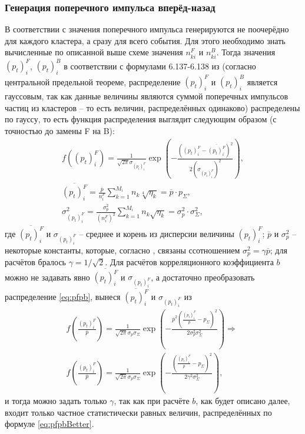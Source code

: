 \subsubsection{Генерация поперечного импульса вперёд-назад}
В соответствии с \cite{dissert} значения поперечного импульса генерируются не поочерёдно для каждого кластера, а сразу для всего события. 
Для этого необходимо знать вычисленные по описанной выше схеме значения $n^F_{ki}$ и $n^B_{ki}$. 
Тогда значения $(p_t)_i^F$, $(p_t)_i^B$ в соответствии с формулами 6.137-6.138 из \cite{dissert} (согласно центральной предельной теореме, распределение $(p_t)_i^F$ и $(p_t)_i^B$ является гауссовым, так как данные величины являются суммой поперечных импульсов частиц из кластеров -- то есть величин, распределённых одинаково) распределены по гауссу, то есть функция распределения выглядит следующим образом (с точностью до замены F на B):
\begin{equation} \label{eq:pfpb}
\begin{split}
	f((p_t)_i^F) = \frac{1}{\sqrt{2\pi} \sigma_{(p_t)_i^F}} \exp{\left( - \frac{((p_t)_i^F - \overline{(p_t)_i^F})^2}{2(\sigma_{(p_t)_i^F})^2} \right)}, \\
	\overline{(p_t)_i^F} = \frac{\overline{p}}{n_i^F} \sum_{k = 1}^{M_i} n_k \sqrt[4]{\eta_k} = \overline{p} \cdot p_\Sigma, \qquad \quad \quad \\
	\sigma_{(p_t)_i^F}^2 = \frac{\sigma_p^2}{(n_i^F)^2} \sum_{k = 1}^{M_i} n_k \sqrt{\eta_k} = \sigma_p^2 \cdot \sigma_\Sigma^2, \quad \quad \quad
\end{split}
\end{equation}
где $\overline{(p_t)_i^F}$ и $\sigma_{(p_t)_i^F}$ -- среднее и корень из дисперсии величины $(p_t)_i^F$; $\overline{p}$ и $\sigma_p^2$ -- некоторые константы, которые, согласно \cite{dissert}, связаны ссотношением $\sigma_p^2 = \gamma \overline{p}$; для расчётов бралось $\gamma = 1/\sqrt{2}$. 
Для расчётов корреляционного коэффициента $b$ можно не задавать явно $\overline{(p_t)_i^F}$ и $\sigma_{(p_t)_i^F}$, а достаточно преобразовать распределение \ref{eq:pfpb}, вынеся $\overline{(p_t)_i^F}$ и $\sigma_{(p_t)_i^F}$ из 
\begin{equation} \label{eq:pfpbBetter}
\begin{split}
	f \left( \frac{ (p_t)_i^F } { \overline{p} } \right) = \frac{1}{\sqrt{2 \pi} \sigma_p \sigma_\Sigma} \exp{ \left( - \frac{ \overline{p}^2 \left( \frac{ (p_t)_i^F }{ \overline{p} } - p_\Sigma \right)^2} { 2 \sigma_p^2 \sigma_\Sigma^2 } \right) } \Longrightarrow \\
	f \left( \frac{ (p_t)_i^F } { \overline{p} } \right) = \frac{1}{\sqrt{2 \pi} \sigma_p \sigma_\Sigma} \exp{ \left( - \frac{ \left( \frac{ (p_t)_i^F }{ \overline{p} } - p_\Sigma \right)^2} { 2 \gamma^2 \sigma_\Sigma^2 } \right) }, \quad \enspace \enspace
\end{split}
\end{equation}
и тогда можно задать только $\gamma$, так как при расчёте $b$, как будет описано далее, входит только частное статистически равных величин, распределённых по формуле \ref{eq:pfpbBetter}.

